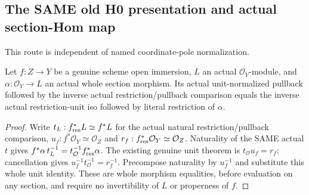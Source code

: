 \subsection{The SAME old H0 presentation and actual section-Hom map}
This route is independent of named coordinate-pole normalization.
\begin{lemma}
\label{lem:seven-original-open-pullback-section-restriction}
\leanok
Let $f:Z\to Y$ be a genuine scheme open immersion, $L$ an actual
$\mathcal O_Y$-module, and $\alpha:\mathcal O_Y\to L$ an actual whole
section morphism. Its actual unit-normalized pullback followed by the
inverse actual restriction/pullback comparison equals the inverse actual
restriction-unit iso followed by literal restriction of $\alpha$.
\end{lemma}
\begin{proof}
Write $t_L:f_{\rm res}^*L\simeq f^*L$ for the actual natural
restriction/pullback comparison, $u_f:f^*\mathcal O_Y\simeq\mathcal O_Z$
and $r_f:f_{\rm res}^*\mathcal O_Y\simeq\mathcal O_Z$.
Naturality of the SAME actual $t$ gives
$f^*\alpha\,t_L^{-1}=t_{\mathcal O}^{-1}f_{\rm res}^*\alpha$.
The existing genuine unit theorem is
$t_{\mathcal O}u_f=r_f$; cancellation gives
$u_f^{-1}t_{\mathcal O}^{-1}=r_f^{-1}$.
Precompose naturality by $u_f^{-1}$ and substitute this whole unit
identity. These are whole morphism equalities, before evaluation on any
section, and require no invertibility of $L$ or properness of $f$.
\end{proof}

